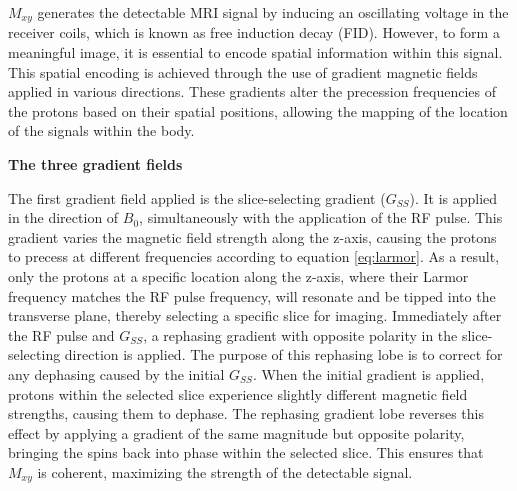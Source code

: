\documentclass{micro-econ-thesis}
\begin{document}
\textbf{$M_{xy}$} generates the detectable MRI signal by inducing an oscillating voltage in the receiver coils, which is known as free induction decay (FID). However, to form a meaningful image, it is essential to encode spatial information within this signal. This spatial encoding is achieved through the use of gradient magnetic fields applied in various directions. These gradients alter the precession frequencies of the protons based on their spatial positions, allowing the mapping of the location of the signals within the body.  

\textbf{The three gradient fields}

The first gradient field applied is the slice-selecting gradient ($G_{SS}$). It is applied in the direction of \textbf{$B_0$}, simultaneously with the application of the RF pulse. 
This gradient varies the magnetic field strength along the z-axis, causing the protons to precess at different frequencies according to equation \ref{eq:larmor}. As a result, only the protons at a specific location along the z-axis, where their Larmor frequency matches the RF pulse frequency, will resonate and be tipped into the transverse plane, thereby selecting a specific slice for imaging. Immediately after the RF pulse and $G_{SS}$, a rephasing gradient with opposite polarity in the slice-selecting direction is applied. The purpose of this rephasing lobe is to correct for any dephasing caused by the initial  $G_{SS}$. When the initial gradient is applied, protons within the selected slice experience slightly different magnetic field strengths, causing them to dephase. The rephasing gradient lobe reverses this effect by applying a gradient of the same magnitude but opposite polarity, bringing the spins back into phase within the selected slice. This ensures that \textbf{$M_{xy}$} is coherent, maximizing the strength of the detectable signal.
\end{document}
